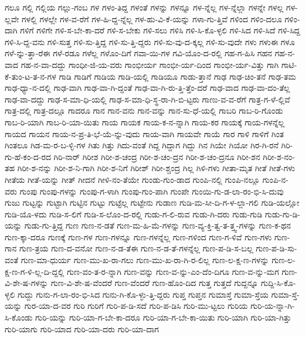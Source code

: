 {ಗಲೂ
ಗಲ್ಲಿ
ಗಲ್ಲಿಯ
ಗಲ್ಲು-ಗಂಬ
ಗಳ
ಗಳಂ-ತಿದ್ದ
ಗಳಂತೆ
ಗಳನ್ನು
ಗಳನ್ನೂ
ಗಳ-ನ್ನೆಲ್ಲ
ಗಳ-ನ್ನೆಲ್ಲಾ
ಗಳನ್ನೇ
ಗಳಲ್ಲ
ಗಳ-ಲ್ಲವೇ
ಗಳಲ್ಲಿ
ಗಳಲ್ಲೇ
ಗಳ-ವ-ರೆಗೆ
ಗಳ-ಹಿ-ದ್ದ-ನ್ನೆಲ್ಲ
ಗಳ-ಹು-ವಿ-ಕೆ-ಯನ್ನು
ಗಳಾ-ಗು-ತ್ತಿವೆ
ಗಳಿಂದ
ಗಳಿಂ-ದಲೂ
ಗಳಿಂ-ದಾಗಿ
ಗಳಿಗೆ
ಗಳಿಗೇ
ಗಳಿ-ಸ-ಬೇ-ಕಾ-ದರೆ
ಗಳಿ-ಸ-ಬೇಕು
ಗಳಿ-ಸಲು
ಗಳಿಸಿ
ಗಳಿ-ಸಿ-ಕೊ-ಳ್ಳಲಿ
ಗಳಿ-ಸಿದ
ಗಳಿ-ಸಿದೆ
ಗಳಿ-ಸಿದ್ದ
ಗಳಿ-ಸಿ-ದ್ದ-ವನು
ಗಳಿ-ಸುತ್ತ
ಗಳಿ-ಸು-ತ್ತಿದ್ದ
ಗಳಿ-ಸು-ತ್ತಿ-ದ್ದರು
ಗಳಿ-ಸು-ವು-ದ-ಕ್ಕಲ್ಲ
ಗಳಿ-ಸು-ವುದೇ
ಗಳು
ಗಳುಈ
ಗಳೂ
ಗಳೆ-ನ್ನು-ತ್ತಾ-ರೆಈ
ಗಳೆ-ರಡೂ
ಗಳೆಲ್ಲ
ಗಳೊಂ-ದಿಗೆ
ಗವಾ-ಯಿ-ಗಳ
ಗವಿ-ಯೊಂ-ದ-ರಲ್ಲಿ
ಗಹ-ಗ-ಹಿಸಿ
ಗಹನ
ಗಹ-ನ-ವಾದ
ಗಹ-ನ-ವಾ-ದದ್ದು
ಗಾಂಧೀ-ಜಿ-ಯ-ವರು
ಗಾಂಭೀರ್ಯ
ಗಾಂಭೀ-ರ್ಯ-ದಿಂದ
ಗಾಂಭೀ-ರ್ಯ-ವಿತ್ತು
ಗಾಗಿ
ಗಾಟಿ-ಕೆ-ತುಂ-ಟ-ತ-ನ-ಗಳ
ಗಾಡಿ
ಗಾಡಿಗೆ
ಗಾಡಿಯ
ಗಾಡಿ-ಯಲ್ಲಿ
ಗಾಡಿಯೂ
ಗಾಡು-ತ್ತಾನೆ
ಗಾಢ
ಗಾಢ-ಚಿಂ-ತನೆ
ಗಾಢ-ತಮ
ಗಾಢ-ಧ್ಯಾ-ನ-ದಲ್ಲಿ
ಗಾಢ-ವಾಗಿ
ಗಾಢ-ವಾ-ಗಿ-ದ್ದಂತೆ
ಗಾಢ-ವಾ-ಗಿ-ರು-ತ್ತಿ-ತ್ತೆಂ-ದರೆ
ಗಾಢ-ವಾದ
ಗಾಢ-ವಾ-ದಂ-ತೆಲ್ಲ
ಗಾಢ-ವಾ-ದದ್ದು
ಗಾಢ-ಸ-ಮಾ-ಧಿ-ಯಲ್ಲಿ
ಗಾಢ-ಸ-ಮಾ-ಧಿ-ಸ್ಥ-ರಾ-ಗಿ-ಬಿ-ಟ್ಟರು
ಗಾಣು-ವ-ವ-ರೆಗೆ
ಗಾತ್ರ-ಗ-ಳೆ-ಲ್ಲಿವೆ
ಗಾತ್ರ-ದಲ್ಲಿ
ಗಾತ್ರ-ದಲ್ಲೂ
ಗಾದರೂ
ಗಾನ
ಗಾನ-ವನು
ಗಾನ-ವನ್ನು
ಗಾನ-ಸು-ಧೆ-ಯಲ್ಲಿ
ಗಾಬರಿ
ಗಾಬ-ರಿ-ಗೊಂಡು
ಗಾಬ-ರಿ-ಯಾಗಿ
ಗಾಬ-ರಿ-ಯಾ-ಯಿತು
ಗಾಯ
ಗಾಯಕ
ಗಾಯ-ಕ-ನ-ನ್ನಾಗಿ
ಗಾಯ-ಕರ
ಗಾಯಕ್ಕೆ
ಗಾಯ-ಗಳನ್ನೆಲ್ಲ
ಗಾಯದ
ಗಾಯನ
ಗಾಯ-ನ-ಪ್ರ-ತಿ-ಭೆ-ಯೆ-ನ್ನು-ವುದು
ಗಾಯ-ವಾಗಿ
ಗಾಯವೇ
ಗಾಯೆ
ಗಾರ
ಗಾಳಿ
ಗಾಳಿಗೆ
ಗಿಂತ
ಗಿಂತಲೂ
ಗಿಡ-ಮ-ರ-ಬ-ಳ್ಳಿ-ಗಳ
ಗಿತು
ಗಿತ್ತು
ಗಿದು-ವಂತೆ
ಗಿದ್ದ
ಗಿದ್ದಾಗ
ಗಿದ್ದು
ಗಿನ
ಗಿಯೇ
ಗಿಯೋ
ಗಿರ-ಗಿ-ರನೆ
ಗಿರಿ-ಗು-ಹೆ-ಕಂ-ದ-ರದ
ಗಿರಿ-ನಾರ್
ಗಿರೀಶ
ಗಿರೀ-ಶ-ಚಂದ್ರ
ಗಿರೀ-ಶ-ಚಂ-ದ್ರನ
ಗಿರೀ-ಶ-ಚಂ-ದ್ರನೂ
ಗಿರೀ-ಶನ
ಗಿರೀ-ಶ-ನಂ-ತಹ
ಗಿರೀ-ಶ-ನನ್ನು
ಗಿರೀ-ಶ-ನಿ-ಗಾಗಿ
ಗಿರೀ-ಶ-ನಿಗೆ
ಗಿರೀಶ್
ಗಿರೀ-ಶ್ಚಂದ್ರ
ಗಿಲ್ಲ
ಗಿಳಿ-ಗಳು
ಗೀತಾ-ಮೃತ
ಗೀತೆ
ಗೀತೆ-ಗಳು
ಗೀತೆಯ
ಗೀತೆ-ಯನ್ನು
ಗೀತ್
ಗೀದನೆ
ಗೀಳಿ-ನಂ-ತೆಯೇ
ಗುಂಡು-ಗುಂ-ಡಾದ
ಗುಂಪಿ-ನಲ್ಲಿ
ಗುಂಪಿ-ನಲ್ಲೂ
ಗುಂಪಿ-ನ-ವರು
ಗುಂಪು
ಗುಂಪು-ಗಳನ್ನು
ಗುಂಪು-ಗ-ಳಾಗಿ
ಗುಂಪು-ಗುಂ-ಪಾಗಿ
ಗುಂಪೇ
ಗುಂಯಿ-ಗು-ಡ-ಲಾ-ರಂ-ಭಿ-ಸಿ-ದುವು
ಗುಜು
ಗುಟ್ಟನ್ನು
ಗುಟ್ಟಾಗಿ
ಗುಟ್ಟಿನ
ಗುಟ್ಟು
ಗುಟ್ಟೆಲ್ಲ
ಗುಟ್ಟೇನು
ಗುಡಾಣ
ಗುಡಿ-ಮ-ಸೀ-ದಿ-ಗ-ಳ-ಲ್ಲಾ-ಗಲಿ
ಗುಡಿ-ಯಲ್ಲೋ
ಗುಡಿ-ಯೊ-ಳದು
ಗುಡಿ-ಸ-ಲಿಗೆ
ಗುಡಿ-ಸ-ಲೊಂ-ದ-ರಲ್ಲಿ
ಗುಡು-ಗ-ಲಿ-ರುವ
ಗುಡು-ಗಿ-ದರು
ಗುಡು-ಗುಡಿ
ಗುಡು-ಗು-ಡಿ-ಯನ್ನು
ಗುಡು-ಗು-ತ್ತಿದ್ದ
ಗುಣ
ಗುಣ-ನ-ಡತೆ
ಗುಣ-ಮ-ಹಿ-ಮೆ-ಗಳನ್ನು
ಗುಣ-ವ್ಯ-ಕ್ತಿ-ತ್ವ-ತ-ತ್ತ್ವ-ಗಳನ್ನು
ಗುಣ-ಕ-ಥನ
ಗುಣ-ಕ್ಕಾ-ದರೂ
ಗುಣಕ್ಕೆ
ಗುಣ-ಗಳ
ಗುಣ-ಗಳನ್ನೂ
ಗುಣ-ಗಳನ್ನೆಲ್ಲ
ಗುಣ-ಗಳಿಂದ
ಗುಣ-ಗ-ಳಿವೆ
ಗುಣ-ಗಳು
ಗುಣ-ಗಾನ
ಗುಣ-ತ್ರಯ
ಗುಣ-ದ-ವನೋ
ಗುಣ-ನ-ಡ-ತೆಈ
ಗುಣ-ನ-ಡ-ತೆ-ಗಳನ್ನೆಲ್ಲ
ಗುಣ-ಪ-ಡಿ-ಸ-ಬಲ್ಲ
ಗುಣ-ಪ-ಡಿ-ಸು-ವಂತೆ
ಗುಣ-ಮಾ-ಧುರ್ಯ
ಗುಣ-ಮು-ಖ-ರಾ-ಗಲು
ಗುಣ-ಮು-ಖ-ರಾ-ಗಿ-ರ-ಲಿಲ್ಲ
ಗುಣ-ಲ-ಕ್ಷ-ಣ-ಗಳನ್ನು
ಗುಣ-ಲ-ಕ್ಷ-ಣ-ಗ-ಳಿ-ಲ್ಲ-ದಿ-ದ್ದಲ್ಲಿ
ಗುಣ-ವಂ-ತ-ರ-ನ್ನಾಗಿ
ಗುಣ-ವನ್ನು
ಗುಣ-ವ-ನ್ನು-ಎಂ-ದೆಂ-ದಿಗೂ
ಗುಣ-ವ-ನ್ನು-ಮಗ
ಗುಣ-ವಿ-ಶೇ-ಷ-ಗಳನ್ನು
ಗುಣ-ವಿ-ಶೇ-ಷ-ವೆಂದರೆ
ಗುಣ-ವೆಂದರೆ
ಗುಣ-ಹೊಂ-ದಿದ
ಗುತ್ತ
ಗುತ್ತದೆ
ಗುದ್ದನ್ನೂ
ಗುದ್ದಿ-ಸಿ-ಕೊ-ಳ್ಳಲಿ
ಗುದ್ದು
ಗುನು-ಗ-ಲಾ-ರಂ-ಭಿ-ಸಿದ
ಗುನು-ಗಿ-ಕೊ-ಳ್ಳು-ತ್ತಿ-ದ್ದರು
ಗುಪ್ತ
ಗುಪ್ತನ
ಗುಮಾಸ್ತೆ
ಗುಮಾ-ಸ್ತೆಯ
ಗುಮಾ-ಸ್ತೆ-ಯನ್ನು
ಗುರ-ಯಾ-ದ-ವರ
ಗುರಿ
ಗುರಿಗೆ
ಗುರಿ-ಪ-ಡಿ-ಸದೆ
ಗುರಿ-ಪ-ಡಿಸಿ
ಗುರಿ-ಮು-ಟ್ಟಲು
ಗುರಿಯ
ಗುರಿ-ಯ-ನ್ನಾ-ಗಿ-ಸಿ-ಕೊಂಡು
ಗುರಿ-ಯನ್ನು
ಗುರಿ-ಯಾ-ಗ-ಬೇ-ಕಾ-ದರೂ
ಗುರಿ-ಯಾ-ಗ-ಬೇ-ಕಾ-ಯಿತು
ಗುರಿ-ಯಾಗಿ
ಗುರಿ-ಯಾ-ಗಿತ್ತು
ಗುರಿ-ಯಾಗು
ಗುರಿ-ಯಾದ
ಗುರಿ-ಯಾ-ದರು
ಗುರಿ-ಯಾ-ದಾಗ
}
